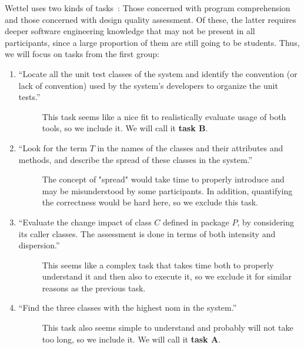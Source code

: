 \documentclass[../thesis]{subfiles}
\begin{document}
Wettel uses two kinds of tasks~\cite[128--130]{wettel2011}:
Those concerned with program comprehension and those concerned with design quality assessment.
Of these, the latter requires deeper software engineering knowledge that may not be present in all participants, since a large proportion of them are still going to be students.
Thus, we will focus on tasks from the first group:
\begin{enumerate}
	\item \enquote{Locate all the unit test classes of the system and identify the convention (or lack of convention) used by the system’s developers to organize the unit tests.}
	      \begin{description}
		      \item[\follows{}] This task seems like a nice fit to realistically evaluate usage of both tools, so we include it.
		            We will call it \textbf{task $\bm{B}$}.
	      \end{description}
	\item \enquote{Look for the term $T$ in the names of the classes and their attributes and methods, and describe the spread of these classes in the system.}
	      \begin{description}
		      \item[\follows{}] The concept of "spread" would take time to properly introduce and may be misunderstood by some participants.
		            In addition, quantifying the correctness would be hard here, so we exclude this task.
	      \end{description}
	\item \enquote{Evaluate the change impact of class $C$ defined in package $P$, by considering its caller classes. The assessment is done in terms of both intensity and dispersion.}
	      \begin{description}
		      \item[\follows{}] This seems like a complex task that takes time both to properly understand it and then also to execute it, so we exclude it for similar reasons as the previous task.
	      \end{description}
	\item \enquote{Find the three classes with the highest \gls{nom} in the system.}
	      \begin{description}
		      \item[\follows{}] This task also seems simple to understand and probably will not take too long, so we include it.
		            We will call it \textbf{task $\bm{A}$}.
	      \end{description}
\end{enumerate}
\end{document}
